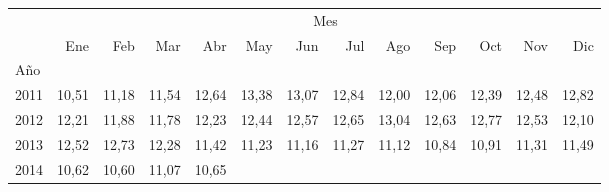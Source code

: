 \begin{tabular}{lllllllllllll}
\cline{1-13}
\multicolumn{1}{c}{} &
  \multicolumn{12}{|c}{Mes} \\
\multicolumn{1}{c}{} &
  \multicolumn{1}{|r}{Ene} &
  \multicolumn{1}{r}{Feb} &
  \multicolumn{1}{r}{Mar} &
  \multicolumn{1}{r}{Abr} &
  \multicolumn{1}{r}{May} &
  \multicolumn{1}{r}{Jun} &
  \multicolumn{1}{r}{Jul} &
  \multicolumn{1}{r}{Ago} &
  \multicolumn{1}{r}{Sep} &
  \multicolumn{1}{r}{Oct} &
  \multicolumn{1}{r}{Nov} &
  \multicolumn{1}{r}{Dic} \\
\cline{1-13}
\multicolumn{1}{l}{Año} &
  \multicolumn{1}{|r}{} &
  \multicolumn{1}{r}{} &
  \multicolumn{1}{r}{} &
  \multicolumn{1}{r}{} &
  \multicolumn{1}{r}{} &
  \multicolumn{1}{r}{} &
  \multicolumn{1}{r}{} &
  \multicolumn{1}{r}{} &
  \multicolumn{1}{r}{} &
  \multicolumn{1}{r}{} &
  \multicolumn{1}{r}{} &
  \multicolumn{1}{r}{} \\
\multicolumn{1}{l}{\hspace{1em}2011} &
  \multicolumn{1}{|r}{10,51} &
  \multicolumn{1}{r}{11,18} &
  \multicolumn{1}{r}{11,54} &
  \multicolumn{1}{r}{12,64} &
  \multicolumn{1}{r}{13,38} &
  \multicolumn{1}{r}{13,07} &
  \multicolumn{1}{r}{12,84} &
  \multicolumn{1}{r}{12,00} &
  \multicolumn{1}{r}{12,06} &
  \multicolumn{1}{r}{12,39} &
  \multicolumn{1}{r}{12,48} &
  \multicolumn{1}{r}{12,82} \\
\multicolumn{1}{l}{\hspace{1em}2012} &
  \multicolumn{1}{|r}{12,21} &
  \multicolumn{1}{r}{11,88} &
  \multicolumn{1}{r}{11,78} &
  \multicolumn{1}{r}{12,23} &
  \multicolumn{1}{r}{12,44} &
  \multicolumn{1}{r}{12,57} &
  \multicolumn{1}{r}{12,65} &
  \multicolumn{1}{r}{13,04} &
  \multicolumn{1}{r}{12,63} &
  \multicolumn{1}{r}{12,77} &
  \multicolumn{1}{r}{12,53} &
  \multicolumn{1}{r}{12,10} \\
\multicolumn{1}{l}{\hspace{1em}2013} &
  \multicolumn{1}{|r}{12,52} &
  \multicolumn{1}{r}{12,73} &
  \multicolumn{1}{r}{12,28} &
  \multicolumn{1}{r}{11,42} &
  \multicolumn{1}{r}{11,23} &
  \multicolumn{1}{r}{11,16} &
  \multicolumn{1}{r}{11,27} &
  \multicolumn{1}{r}{11,12} &
  \multicolumn{1}{r}{10,84} &
  \multicolumn{1}{r}{10,91} &
  \multicolumn{1}{r}{11,31} &
  \multicolumn{1}{r}{11,49} \\
\multicolumn{1}{l}{\hspace{1em}2014} &
  \multicolumn{1}{|r}{10,62} &
  \multicolumn{1}{r}{10,60} &
  \multicolumn{1}{r}{11,07} &
  \multicolumn{1}{r}{10,65} &

\end{tabular}
